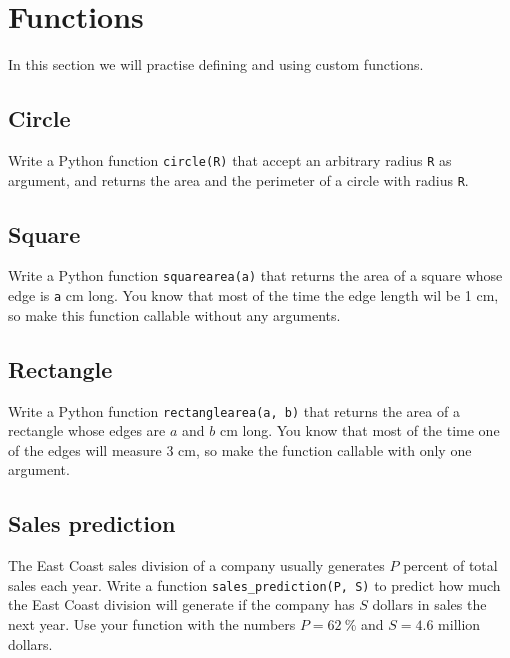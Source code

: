 
\section{Functions}

In this section we will practise defining and using custom functions.

\subsection{Circle}

Write a Python function {\tt circle(R)} that accept an arbitrary radius {\tt R}
as argument, and returns the area and the perimeter of a circle with radius {\tt R}.


\subsection{Square}

Write a Python function {\tt squarearea(a)} that returns the area of a square whose 
edge is {\tt a} cm long. You know that most of the time the edge length wil be 1 cm,
so make this function callable without any arguments.


\subsection{Rectangle}

Write a Python function {\tt rectanglearea(a, b)} that returns the area of a rectangle 
whose edges are $a$ and $b$ cm long. You know that most of the time one of the edges 
will measure 3 cm, so make the function callable with only one argument.


\subsection{Sales prediction}

The East Coast sales division of a company usually generates $P$
percent of total sales each year. Write a function {\tt sales\_prediction(P, S)} to predict how much 
the East Coast division will generate if the company has $S$ dollars in sales the next year. 
Use your function with the numbers $P = 62\ \%$ and $S = 4.6$ million dollars. 

